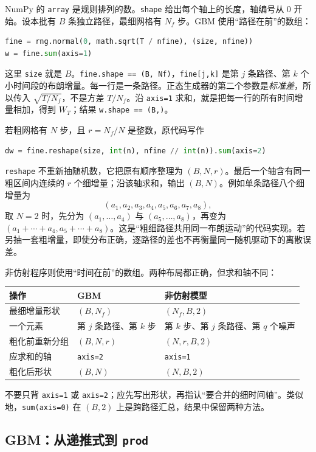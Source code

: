 \documentclass[11pt,a4paper,fontset=none]{ctexart}
\numberwithin{equation}{section}
\begin{document}
NumPy 的 \texttt{array} 是规则排列的数。\texttt{shape} 给出每个轴上的长度，轴编号从 0 开始。设本批有 $B$ 条独立路径，最细网格有 $N_f$ 步。GBM 使用“路径在前”的数组：
\begin{lstlisting}[language=Python]
fine = rng.normal(0, math.sqrt(T / nfine), (size, nfine))
w = fine.sum(axis=1)
\end{lstlisting}
这里 \texttt{size} 就是 $B$。\texttt{fine.shape == (B, Nf)}，\texttt{fine[j,k]} 是第 $j$ 条路径、第 $k$ 个小时间段的布朗增量。每一行是一条路径。正态生成器的第二个参数是\emph{标准差}，所以传入 $\sqrt{T/N_f}$，不是方差 $T/N_f$。沿 \texttt{axis=1} 求和，就是把每一行的所有时间增量相加，得到 $W_T$；结果 \texttt{w.shape == (B,)}。

若粗网格有 $N$ 步，且 $r=N_f/N$ 是整数，原代码写作
\begin{lstlisting}[language=Python]
dw = fine.reshape(size, int(n), nfine // int(n)).sum(axis=2)
\end{lstlisting}
\texttt{reshape} 不重新抽随机数，它把原有顺序整理为 $(B,N,r)$。最后一个轴含有同一粗区间内连续的 $r$ 个细增量；沿该轴求和，输出 $(B,N)$。例如单条路径八个细增量为
\[
(a_1,a_2,a_3,a_4,a_5,a_6,a_7,a_8),
\]
取 $N=2$ 时，先分为 $(a_1,\ldots,a_4)$ 与 $(a_5,\ldots,a_8)$，再变为 $(a_1+\cdots+a_4,a_5+\cdots+a_8)$。这是“粗细路径共用同一布朗运动”的代码实现。若另抽一套粗增量，即使分布正确，逐路径的差也不再衡量同一随机驱动下的离散误差。

非仿射程序则使用“时间在前”的数组。两种布局都正确，但求和轴不同：
\begin{center}
\small
\begin{tabularx}{\textwidth}{@{}lXX@{}}
\toprule
操作 & GBM & 非仿射模型\\
\midrule
最细增量形状 & $(B,N_f)$ & $(N_f,B,2)$\\
一个元素 & 第 $j$ 条路径、第 $k$ 步 & 第 $k$ 步、第 $j$ 条路径、第 $q$ 个噪声\\
粗化前重新分组 & $(B,N,r)$ & $(N,r,B,2)$\\
应求和的轴 & \texttt{axis=2} & \texttt{axis=1}\\
粗化后形状 & $(B,N)$ & $(N,B,2)$\\
\bottomrule
\end{tabularx}
\end{center}
不要只背 \texttt{axis=1} 或 \texttt{axis=2}；应先写出形状，再指认“要合并的细时间轴”。类似地，\texttt{sum(axis=0)} 在 $(B,2)$ 上是跨路径汇总，结果中保留两种方法。

\subsection{GBM：从递推式到 \texttt{prod}}
\end{document}
